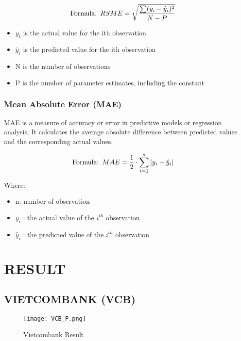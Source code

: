 \documentclass{ieeeojies}
\begin{document}
\begin{align*}
    &\text{Formula:} \hspace{0.5em} RSME = \sqrt{\frac{\sum(y_i - \hat{y}_i)^2}{N-P}}
\end{align*}

\begin{itemize}
    \item $y_i$ is the actual value for the ith observation
    \item $\hat{y}_i$ is the predicted value for the ith observation
    \item N is the number of observations
    \item P is the number of parameter estimates, including the constant
\end{itemize}

\subsubsection{\textbf{Mean Absolute Error (MAE)}}
MAE is a measure of accuracy or error in predictive models or regression analysis. It calculates the average absolute difference between predicted values and the corresponding actual values.

\begin{align*}
    &\text{Formula:} \hspace{0.5em} MAE = \frac{1}{2}\cdot \sum_{i=1}^n |y_i - \hat{y}_{i}|
\end{align*}

Where:
\begin{itemize}
    \item n: number of observation
    \item $y_i$ : the actual value of the $i^{th}$ observation
    \item  $\hat{y}_i$ : the predicted value of the $i^{th}$ observation
\end{itemize}

\section{RESULT}

\subsection{VIETCOMBANK (VCB)}
\begin{figure}[ht]
  \centering
  \texttt{[image: VCB\_P.png]}
  \caption{Vietcombank Result}
  \label{fig:VCB}
\end{figure}
\vspace{10mm}
\end{document}
